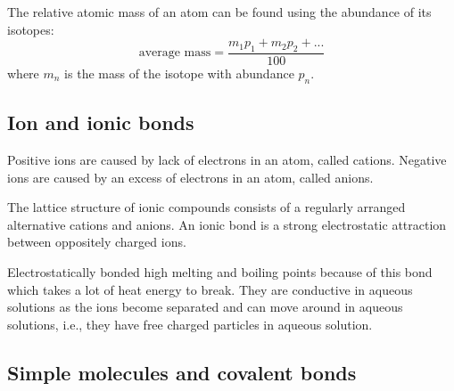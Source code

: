The relative atomic mass of an atom can be found using the abundance of its isotopes:
$$
\textrm{average mass} = \frac{m_1 p_1 + m_2 p_2 + ...}{100}
$$
where $m_n$ is the mass of the isotope with abundance $p_n$. 

\subsection{Ion and ionic bonds}
Positive ions are caused by lack of electrons in an atom, called cations. Negative ions are caused
by an excess of electrons in an atom, called anions.

The lattice structure of ionic compounds consists of a regularly arranged alternative cations
and anions. An ionic bond is a strong electrostatic attraction between oppositely charged ions.

Electrostatically bonded high melting and boiling points because of this bond which takes a lot of 
heat energy
to break. They are conductive in aqueous solutions as the ions become separated and can move around
in aqueous solutions, i.e., they have free charged particles in aqueous solution.

\subsection{Simple molecules and covalent bonds}
